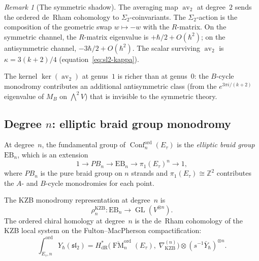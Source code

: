 \documentclass[11pt,reqno]{amsart}
\theoremstyle{definition}
\theoremstyle{remark}
\newtheorem{remark}[theorem]{Remark}
\DeclareMathOperator{\Conf}{Conf}
\DeclareMathOperator{\FM}{FM}
\DeclareMathOperator{\av}{av}
\newcommand{\ZZ}{\mathbb{Z}}
\numberwithin{equation}{section}
\begin{document}
\begin{remark}[The symmetric shadow]
\label{rem:ell-degree2-shadow}
The averaging map $\av_2$ at degree~$2$ sends the
ordered de~Rham cohomology to $\Sigma_2$-coinvariants.
The $\Sigma_2$-action is the composition of the geometric
swap $w \mapsto -w$ with the $R$-matrix. On the symmetric
channel, the $R$-matrix eigenvalue is
$+\hbar/2 + O(\hbar^2)$; on the antisymmetric channel,
$-3\hbar/2 + O(\hbar^2)$.
The scalar surviving $\av_2$ is
$\kappa = 3(k + 2)/4$ (equation~\eqref{eq:sl2-kappa}).

The kernel $\ker(\av_2)$ at genus~$1$ is richer than at
genus~$0$: the $B$-cycle monodromy contributes an
additional antisymmetric class (from the
$e^{3\pi i/(k+2)}$ eigenvalue of $M_B$ on
$\bigwedge^2 V$) that is invisible to the
symmetric theory.
\end{remark}

\subsection{Degree $n$: elliptic braid group monodromy}
\label{subsec:ell-degree-n}

At degree~$n$, the fundamental group of
$\Conf_n^{\mathrm{ord}}(E_\tau)$ is the \emph{elliptic
braid group} $\mathrm{EB}_n$, which is an extension
\begin{equation}\label{eq:ell-braid}
  1 \to PB_n \to \mathrm{EB}_n \to
  \pi_1(E_\tau)^n \to 1,
\end{equation}
where $PB_n$ is the pure braid group on $n$ strands and
$\pi_1(E_\tau) \cong \ZZ^2$ contributes the $A$- and
$B$-cycle monodromies for each point.

The KZB monodromy representation at degree~$n$ is
\begin{equation}\label{eq:kzb-monodromy-n}
  \rho_n^{\mathrm{KZB}} \colon
  \mathrm{EB}_n \to
  \operatorname{GL}(V^{\otimes n}).
\end{equation}
The ordered chiral homology at degree~$n$ is the de~Rham
cohomology of the KZB local system on the Fulton--MacPherson
compactification:
\begin{equation}\label{eq:ell-degree-n}
  \int_{E_\tau, n}^{\mathrm{ord}}
  Y_\hbar(\mathfrak{sl}_2)
  = H^*_{\mathrm{dR}}\bigl(
  \overline{\FM}_n^{\mathrm{ord}}(E_\tau),\;
  \nabla_{\mathrm{KZB}}^{(n)}\bigr)
  \otimes (s^{-1}\bar{Y}_\hbar)^{\otimes n}.
\end{equation}
\end{document}
